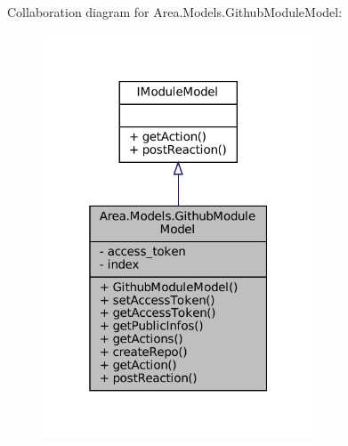 Collaboration diagram for Area.\+Models.\+Github\+Module\+Model\+:
\nopagebreak
\begin{figure}[H]
\begin{center}
\leavevmode
\includegraphics[width=229pt]{classArea_1_1Models_1_1GithubModuleModel__coll__graph}
\end{center}
\end{figure}
